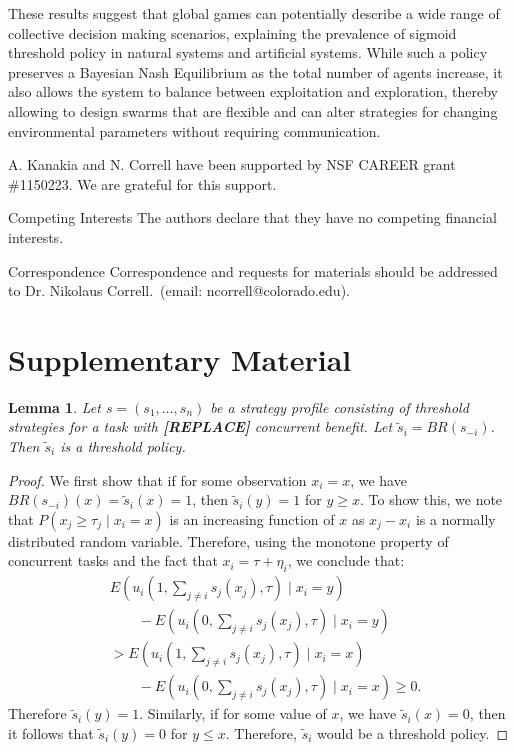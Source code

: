 \documentclass{nature}
\newtheorem{lemma}{Lemma}
\begin{document}
These results suggest that global games can potentially describe a wide range of collective decision making scenarios, explaining the prevalence of sigmoid threshold policy in natural systems and artificial systems. While such a policy preserves a Bayesian Nash Equilibrium as the total number of agents increase, it also allows the system to balance between exploitation and exploration, thereby allowing to design swarms that are flexible and can alter strategies for changing environmental parameters without requiring communication.

\nolinenumbers


\begin{addendum}
 \item A. Kanakia and N. Correll have been supported by NSF CAREER grant \#1150223. We are grateful for this support. 
 \item[Competing Interests] The authors declare that they have no
competing financial interests.
 \item[Correspondence] Correspondence and requests for materials
should be addressed to Dr. Nikolaus Correll.~(email: ncorrell@colorado.edu).
\end{addendum}


\newpage
\section*{Supplementary Material}

\setcounter{lemma}{0}
\begin{lemma}
Let $s=(s_1,\ldots,s_n)$ be a strategy profile consisting of threshold strategies for a task with \textbf{[REPLACE]} concurrent benefit. Let $\tilde{s}_i=BR(s_{-i})$. Then $\tilde{s}_i$ is a threshold policy. 
\end{lemma} 

\begin{proof}
We first show that if for some observation $x_i=x$, we have $BR(s_{-i})(x)=\tilde{s}_i(x)=1$, then $\tilde{s}_i(y)=1$ for $y\geq x$. To show this,  we note that $P(x_j\geq \tau_j\mid x_i=x)$ is an increasing function of $x$ as $x_j-x_i$ is a normally distributed random variable. Therefore, using the monotone property of concurrent tasks and the fact that $x_i=\tau+\eta_i$, we conclude that:
\vspace{-5px}
\begin{align*}
&E(u_i(1,\sum_{j\not=i}s_j(x_j),\tau)\mid x_i=y)\\ 
&\qquad-E(u_i(0,\sum_{j\not=i}s_j(x_j),\tau)\mid x_i=y)\\ 
&>E(u_i(1,\sum_{j\not=i}s_j(x_j),\tau)\mid x_i=x)\\
&\qquad-E(u_i(0,\sum_{j\not=i}s_j(x_j),\tau)\mid x_i=x)\geq 0.
\end{align*}
Therefore $\tilde{s}_i(y)=1$. Similarly, if for some value of $x$, we have $\tilde{s}_i(x)=0$, then it follows that $\tilde{s}_i(y)=0$ for $y\leq x$. Therefore, $\tilde{s}_i$ would be a threshold policy.  
\end{proof}
\end{document}
